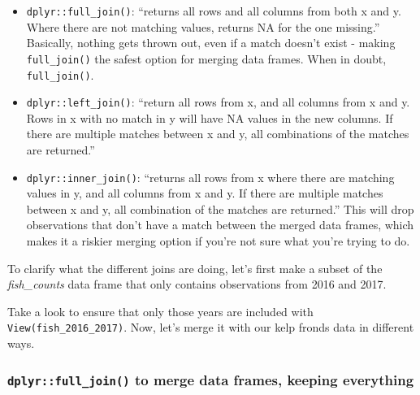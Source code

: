 \documentclass[]{book}
\newenvironment{Shaded}{\begin{snugshade}}{\end{snugshade}}
\newcommand{\DecValTok}[1]{\textcolor[rgb]{0.00,0.00,0.81}{#1}}
\newcommand{\KeywordTok}[1]{\textcolor[rgb]{0.13,0.29,0.53}{\textbf{#1}}}
\newcommand{\NormalTok}[1]{#1}
\newcommand{\OperatorTok}[1]{\textcolor[rgb]{0.81,0.36,0.00}{\textbf{#1}}}
\newcommand{\StringTok}[1]{\textcolor[rgb]{0.31,0.60,0.02}{#1}}
\providecommand{\tightlist}{%
  \setlength{\itemsep}{0pt}\setlength{\parskip}{0pt}}
\begin{document}
\begin{itemize}
\tightlist
\item
  \texttt{dplyr::full\_join()}: ``returns all rows and all columns from both x and y. Where there are not matching values, returns NA for the one missing.'' Basically, nothing gets thrown out, even if a match doesn't exist - making \texttt{full\_join()} the safest option for merging data frames. When in doubt, \texttt{full\_join()}.
\item
  \texttt{dplyr::left\_join()}: ``return all rows from x, and all columns from x and y. Rows in x with no match in y will have NA values in the new columns. If there are multiple matches between x and y, all combinations of the matches are returned.''
\item
  \texttt{dplyr::inner\_join()}: ``returns all rows from x where there are matching values in y, and all columns from x and y. If there are multiple matches between x and y, all combination of the matches are returned.'' This will drop observations that don't have a match between the merged data frames, which makes it a riskier merging option if you're not sure what you're trying to do.
\end{itemize}

To clarify what the different joins are doing, let's first make a subset of the \emph{fish\_counts} data frame that only contains observations from 2016 and 2017.

\begin{Shaded}
\end{Shaded}

Take a look to ensure that only those years are included with \texttt{View(fish\_2016\_2017)}. Now, let's merge it with our kelp fronds data in different ways.

\hypertarget{dplyrfull_join-to-merge-data-frames-keeping-everything}{%
\subsubsection{\texorpdfstring{\texttt{dplyr::full\_join()} to merge data frames, keeping everything}{dplyr::full\_join() to merge data frames, keeping everything}}\label{dplyrfull_join-to-merge-data-frames-keeping-everything}}
\end{document}
